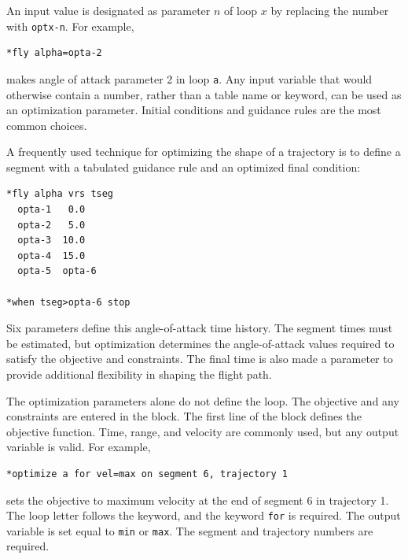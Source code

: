 
An input value is designated as parameter $n$ of loop $x$ by replacing the number
with \texttt{optx-n}.  For example,

\begin{lstlisting}[style=taosmanual]
*fly alpha=opta-2
\end{lstlisting}

makes angle of attack parameter 2 in loop \texttt{a}.  Any input variable that would
otherwise contain a number, rather than a table name or keyword, can be used as an
optimization parameter.  Initial conditions and guidance rules are the most common
choices.

A frequently used technique for optimizing the shape of a trajectory is to define a
segment with a tabulated guidance rule and an optimized final condition:

\begin{lstlisting}[style=taosmanual]
*fly alpha vrs tseg
  opta-1   0.0
  opta-2   5.0
  opta-3  10.0
  opta-4  15.0
  opta-5  opta-6

*when tseg>opta-6 stop
\end{lstlisting}

Six parameters define this angle-of-attack time history.  The segment times must be
estimated, but optimization determines the angle-of-attack values required to satisfy
the objective and constraints.  The final time is also made a parameter to provide
additional flexibility in shaping the flight path.


The optimization parameters alone do not define the loop.  The objective and any
constraints are entered in the  block.  The first line of the
block defines the objective function.  Time, range, and velocity are commonly used,
but any output variable is valid.  For example,

\begin{lstlisting}[style=taosmanual]
*optimize a for vel=max on segment 6, trajectory 1
\end{lstlisting}

sets the objective to maximum velocity at the end of segment 6 in trajectory 1.  The
loop letter follows the  keyword, and the keyword
\texttt{for} is required.  The output variable is set equal to \texttt{min} or
\texttt{max}.  The segment and trajectory numbers are required.


